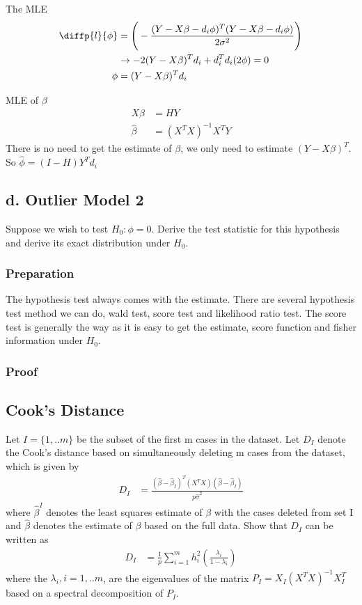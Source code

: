\documentclass[11pt]{article} %
\begin{document}
The MLE 
\begin{align*}
	\diffp{l}{\phi} & =\Bigg( -\frac{(Y- X\beta -d_i \phi)^T (Y- X\beta -d_i \phi)}{2 \sigma^2}  \Bigg) \\
	&\rightarrow -2(Y-X\beta)^T d_i + d_i^T d_i (2 \phi) = 0 \\
	\phi &= (Y-X\beta)^T d_i
\end{align*}

MLE of $\beta$ 
\begin{align*}
	X\beta & = HY \\
	\hat{\beta} &= (X^TX)^{-1} X^T Y
\end{align*}
There is no need to get the estimate of $\beta$, we only need to estimate  $(Y-X\beta)^T$. 
So $\hat{\phi} = (I-H)Y^T d_i$

\subsection{d. Outlier Model 2}
Suppose we wish to test $H_0 : \phi = 0$. Derive the test statistic for this hypothesis and derive its exact distribution under $H_0$.

\subsubsection{Preparation}

The hypothesis test always comes with the estimate. There are several hypothesis test method we can do, wald test, score test and likelihood ratio test. The score test is generally the way as it is easy to get the estimate, score function and fisher information under $H_0$.

\subsubsection{Proof}


\subsection{Cook's Distance}
 Let $I = \{ 1,.. m\}$ be the subset of the first m cases in the dataset. Let $D_I$ denote the Cook's distance based on simultaneously deleting m cases from the dataset, which is given by
\begin{align*}
	D_I & = \frac{(\hat{\beta} - \hat{\beta}_I)^T (X^T X) (\hat{\beta} - \hat{\beta}_I)}{p \hat{\sigma}^2}
\end{align*} 
where $\hat{\beta}^I$ denotes the least squares estimate of $\beta$ with the cases deleted from set I and $\hat{\beta}$ denotes the estimate of $\beta$ based on the full data. Show that $D_I$ can be written as 
\begin{align*}
	D_I & = \frac{1}{p} \sum_{i=1}^m h_i^2 \left( \frac{\lambda_i}{1- \lambda_i} \right)
\end{align*} 	
where the $\lambda_i, i=1,..m$, are the eigenvalues of the matrix $P_I = X_I (X^T X)^{-1} X_I^T$ based on a spectral decomposition of $P_I$.
 
 
\end{document}
